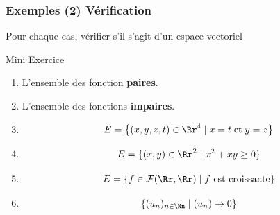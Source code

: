 \documentclass[dvipsnames]{beamer}
\begin{document}
\begin{frame}[t]
  \frametitle{Exemples (2) Vérification}
  Pour chaque cas, vérifier s'il s'agit d'un espace vectoriel


  \begin{block}{Mini Exercice}
    \begin{enumerate}
      \small
      \item L'ensemble des fonction \textbf{paires}.\\[6pt]

      \item L'ensemble des fonctions \textbf{impaires}.\\[6pt]

      \item
        \begin{equation*}
          E=\left\{(x,y,z,t)\in\Rr^4\;|\; x=t\;\text{et}\; y=z\right\}
        \end{equation*}
      \item 
        \begin{equation*}
          E=\{(x,y)\in \Rr^2\;|\; x^2 + xy\geq 0\}
        \end{equation*}
      \item 
        \begin{equation*}
          E = \{f\in \mathcal{F}(\Rr,\Rr)\;|\; f \text{ est
          croissante}\}
        \end{equation*}
      \item 
\begin{equation*}
  \left\{(u_n)_{n\in\Nn}\;|\; (u_n)\to 0\right\}
\end{equation*}
    \end{enumerate}
  \end{block}
  
\end{frame}
\end{document}
